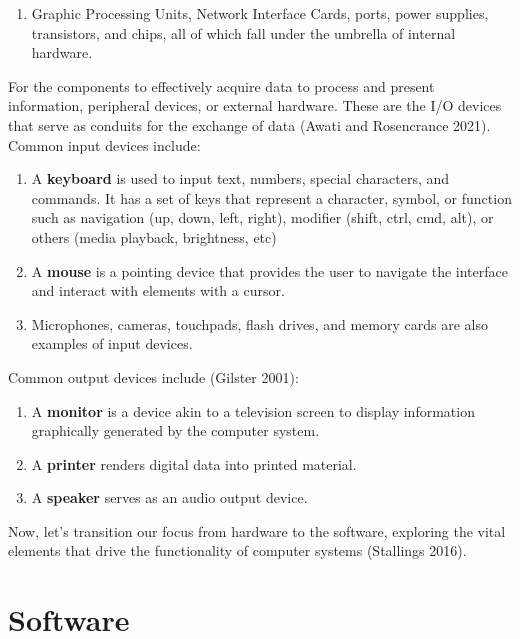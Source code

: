 \documentclass[
  letterpaper,
  DIV=11,
  numbers=noendperiod]{scrreprt}
\providecommand{\tightlist}{%
  \setlength{\itemsep}{0pt}\setlength{\parskip}{0pt}}\usepackage{longtable,booktabs,array}
\begin{document}
\begin{enumerate}
\def\labelenumi{\arabic{enumi}.}
\setcounter{enumi}{3}
\tightlist
\item
  Graphic Processing Units, Network Interface Cards, ports, power
  supplies, transistors, and chips, all of which fall under the umbrella
  of internal hardware.
\end{enumerate}

For the components to effectively acquire data to process and present
information, peripheral devices, or external hardware. These are the I/O
devices that serve as conduits for the exchange of data (Awati and
Rosencrance 2021). Common input devices include:

\begin{enumerate}
\def\labelenumi{\arabic{enumi}.}
\tightlist
\item
  A \textbf{keyboard} is used to input text, numbers, special
  characters, and commands. It has a set of keys that represent a
  character, symbol, or function such as navigation (up, down, left,
  right), modifier (shift, ctrl, cmd, alt), or others (media playback,
  brightness, etc)
\item
  A \textbf{mouse} is a pointing device that provides the user to
  navigate the interface and interact with elements with a cursor.
\item
  Microphones, cameras, touchpads, flash drives, and memory cards are
  also examples of input devices.
\end{enumerate}

Common output devices include (Gilster 2001):

\begin{enumerate}
\def\labelenumi{\arabic{enumi}.}
\tightlist
\item
  A \textbf{monitor} is a device akin to a television screen to display
  information graphically generated by the computer system.
\item
  A \textbf{printer} renders digital data into printed material.
\item
  A \textbf{speaker} serves as an audio output device.
\end{enumerate}

Now, let's transition our focus from hardware to the software, exploring
the vital elements that drive the functionality of computer systems
(Stallings 2016).

\section{Software}\label{software}
\end{document}

